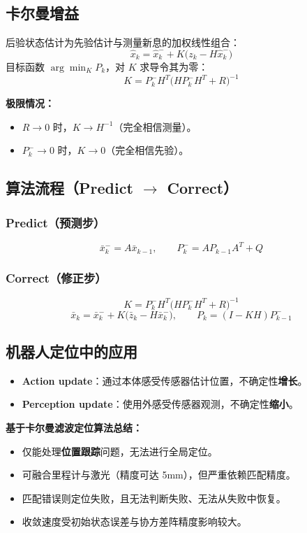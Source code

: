 \documentclass[11pt,a4paper]{article}
\begin{document}
\subsection{卡尔曼增益}

后验状态估计为先验估计与测量新息的加权线性组合：
\[
\hat{x}_k=\hat{x}^-_k + K\bigl(z_k-H\hat{x}^-_k\bigr)
\]
目标函数 $\arg\min_K P_k$，对 $K$ 求导令其为零：
\[
\boxed{\;K=P^-_k H^T\bigl(HP^-_k H^T+R\bigr)^{-1}\;}
\]

\begin{notebox}
\textbf{极限情况：}
\begin{itemize}
  \item $R\to 0$ 时，$K\to H^{-1}$（完全相信测量）。
  \item $P^-_k\to 0$ 时，$K\to 0$（完全相信先验）。
\end{itemize}
\end{notebox}

\subsection{算法流程（Predict $\to$ Correct）}

\subsubsection*{Predict（预测步）}
\[
\bar{x}^-_k=A\bar{x}_{k-1},\qquad P^-_k=AP_{k-1}A^T+Q
\]

\subsubsection*{Correct（修正步）}
\[
K=P^-_k H^T\bigl(HP^-_k H^T+R\bigr)^{-1}
\]
\[
\bar{x}_k=\bar{x}^-_k+K\bigl(\bar{z}_k-H\bar{x}^-_k\bigr),\qquad
P_k=(I-KH)P^-_{k-1}
\]

\subsection{机器人定位中的应用}

\begin{itemize}
  \item \textbf{Action update}：通过本体感受传感器估计位置，不确定性\textbf{增长}。
  \item \textbf{Perception update}：使用外感受传感器观测，不确定性\textbf{缩小}。
\end{itemize}

\begin{notebox}
\textbf{基于卡尔曼滤波定位算法总结：}
\begin{itemize}
  \item 仅能处理\textbf{位置跟踪}问题，无法进行全局定位。
  \item 可融合里程计与激光（精度可达 5mm），但严重依赖匹配精度。
  \item 匹配错误则定位失败，且无法判断失败、无法从失败中恢复。
  \item 收敛速度受初始状态误差与协方差阵精度影响较大。
\end{itemize}
\end{notebox}
\end{document}
